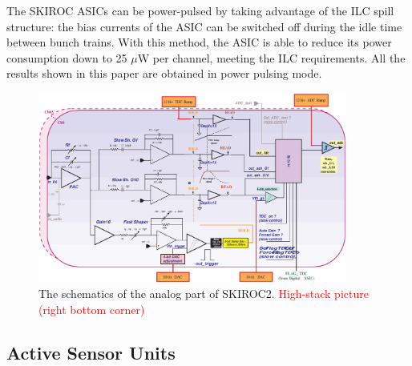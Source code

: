 \documentclass[a4paper,11pt]{article}
\newcommand{\todo}[1]{\textcolor{red}{{#1}}}
\begin{document}
The SKIROC ASICs can be power-pulsed by taking advantage of the ILC spill structure: 
the bias currents of the ASIC can be switched off during the idle time between bunch trains.
With this method, the ASIC is able to reduce its power consumption down to 25 $\mu$W per channel,
meeting the ILC requirements. All the results shown in this paper are obtained in power pulsing mode.

\begin{figure}[!t]
  \centering
    \includegraphics[width=4in]{../figs/skiroc2_block.eps}
\caption{The schematics of the analog part of SKIROC2. \todo{High-stack picture (right bottom corner)}}
\label{SKIROC2}
\end{figure}

\subsection{Active Sensor Units}
\label{sec:ASU}
\end{document}
